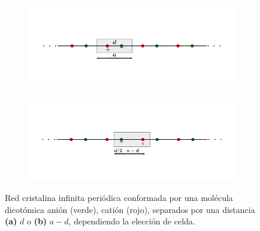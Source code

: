 \begin{figure}[h!]
    \centering
   \captionsetup[sub]{font=small}
    \begin{minipage}[h!]{1\textwidth}
        \begin{subfigure}[b!]{1 \textwidth}
            \caption{}
            \vspace*{-2em}
            \includegraphics[width=\textwidth]{Imagenes/Models/polarizatio_example_a.pdf}
        \end{subfigure}\hspace*{-0.5em}
    \end{minipage}\vspace*{-2.5em}

    \begin{minipage}[h!]{1\textwidth}
        \begin{subfigure}[b!]{1 \textwidth}
            \caption{}
            \vspace*{-2em}
            \includegraphics[width=\textwidth]{Imagenes/Models/polarizatio_example_b.pdf}
        \end{subfigure}\hspace*{-0.5em}
    \end{minipage}\vspace*{-1.5em}
    
    \caption{Red cristalina infinita periódica conformada por una molécula dicotómica anión (verde), catión (rojo), separados por una distancia \textbf{(a)} $d$ o \textbf{(b)} $a-d$, dependiendo la elección de celda.}
    \label{fig:Model_polarization}
\end{figure}